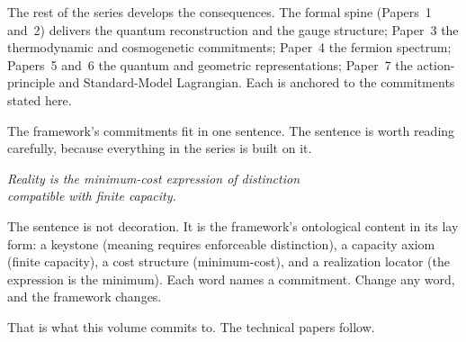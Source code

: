 \documentclass[11pt]{article}
\begin{document}
The rest of the series develops the consequences. The formal spine (Papers~1 and~2) delivers the quantum reconstruction and the gauge structure; Paper~3 the thermodynamic and cosmogenetic commitments; Paper~4 the fermion spectrum; Papers~5 and~6 the quantum and geometric representations; Paper~7 the action-principle and Standard-Model Lagrangian. Each is anchored to the commitments stated here.

The framework's commitments fit in one sentence. The sentence is worth reading carefully, because everything in the series is built on it.

\bigskip
\begin{center}
\itshape
Reality is the minimum-cost expression of distinction\\
compatible with finite capacity.
\end{center}
\bigskip

\noindent The sentence is not decoration. It is the framework's ontological content in its lay form: a keystone (meaning requires enforceable distinction), a capacity axiom (finite capacity), a cost structure (minimum-cost), and a realization locator (the expression is the minimum). Each word names a commitment. Change any word, and the framework changes.

That is what this volume commits to. The technical papers follow.

\clearpage
\end{document}
